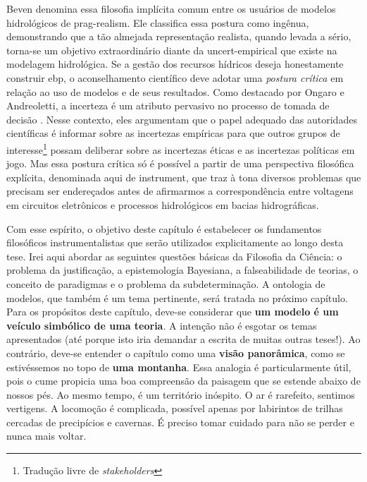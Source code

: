 \documentclass[./main.tex]{subfiles}
\begin{document}
\par Beven denomina essa filosofia implícita comum entre os usuários de modelos hidrológicos de \gls{prag-realism}. Ele classifica essa postura como ingênua, demonstrando que a tão almejada representação realista, quando levada a sério, torna-se um objetivo extraordinário diante da \gls{uncert-empirical} que existe na modelagem hidrológica. Se a gestão dos recursos hídricos deseja honestamente construir \gls{ebp}, o aconselhamento científico deve adotar uma \textit{postura crítica} em relação ao uso de modelos e de seus resultados. Como destacado por Ongaro e Andreoletti, a incerteza é um atributo pervasivo no processo de tomada de decisão \cite{Ongaro2022}. Nesse contexto, eles argumentam que o papel adequado das autoridades científicas é informar sobre as incertezas empíricas para que outros grupos de interesse\footnote{Tradução livre de \textit{stakeholders}} possam deliberar sobre as incertezas éticas e as incertezas políticas em jogo. Mas essa postura crítica só é possível a partir de uma perspectiva filosófica explícita, denominada aqui de \gls{instrument}, que traz à tona diversos problemas que precisam ser endereçados antes de afirmarmos a correspondência entre voltagens em circuitos eletrônicos e processos hidrológicos em bacias hidrográficas. 

\par Com esse espírito, o objetivo deste capítulo é estabelecer os fundamentos filosóficos instrumentalistas que serão utilizados explicitamente ao longo desta tese. Irei aqui abordar as seguintes questões básicas da Filosofia da Ciência: o problema da justificação, a epistemologia Bayesiana, a falseabilidade de teorias, o conceito de paradigmas e o problema da subdeterminação. A ontologia de modelos, que também é um tema pertinente, será tratada no próximo capítulo. Para os propósitos deste capítulo, deve-se considerar que \textbf{um modelo é um veículo simbólico de uma teoria}. A intenção não é esgotar os temas apresentados (até porque isto iria demandar a escrita de muitas outras teses!). Ao contrário, deve-se entender o capítulo como uma \textbf{visão panorâmica}, como se estivéssemos no topo de \textbf{uma montanha}. Essa analogia é particularmente útil, pois o cume propicia uma boa compreensão da paisagem que se estende abaixo de nossos pés. Ao mesmo tempo, é um território inóspito. O ar é rarefeito, sentimos vertigens. A locomoção é complicada, possível apenas por labirintos de trilhas cercadas de precipícios e cavernas. É preciso tomar cuidado para não se perder e nunca mais voltar.
\end{document}
